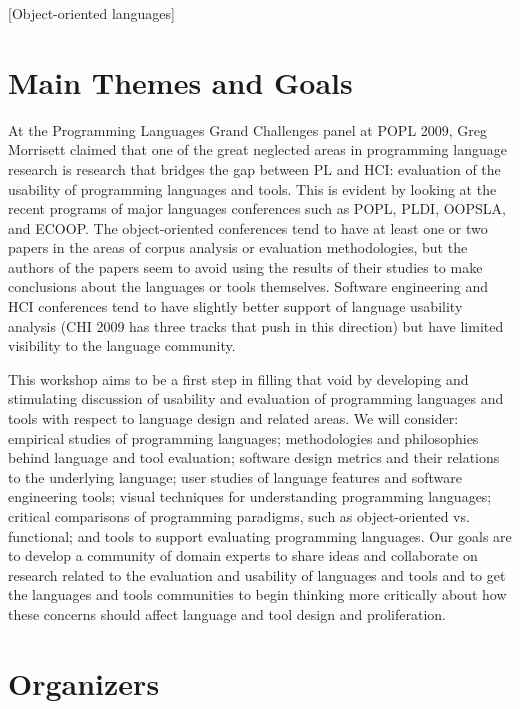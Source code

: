 \documentclass{acm_proc_article-sp}
\begin{document}
[Object-oriented languages]



\section{Main Themes and Goals}

At the Programming Languages Grand Challenges panel at POPL 2009, Greg
Morrisett claimed that one of the great neglected areas in programming
language research is research that bridges the gap between PL and HCI:
evaluation of the usability of programming languages and tools. This
is evident by looking at the recent programs of major languages
conferences such as POPL, PLDI, OOPSLA, and ECOOP. The object-oriented
conferences tend to have at least one or two papers in the areas of
corpus analysis or evaluation methodologies, but the authors of the
papers seem to avoid using the results of their studies to make
conclusions about the languages or tools themselves. Software
engineering and HCI conferences tend to have slightly better support
of language usability analysis (CHI 2009 has three tracks that push in
this direction) but have limited visibility to the language community.

This workshop aims to be a first step in filling that void by
developing and stimulating discussion of usability and evaluation of
programming languages and tools with respect to language design and
related areas.  We will consider: empirical studies of programming
languages; methodologies and philosophies behind language and tool
evaluation; software design metrics and their relations to the
underlying language; user studies of language features and software
engineering tools; visual techniques for understanding programming
languages; critical comparisons of programming paradigms, such as
object-oriented vs. functional; and tools to support evaluating
programming languages.  Our goals are to develop a community of domain
experts to share ideas and collaborate on research related to the
evaluation and usability of languages and tools and to get the
languages and tools communities to begin thinking more critically
about how these concerns should affect language and tool design and
proliferation.



\section{Organizers}
\end{document}
